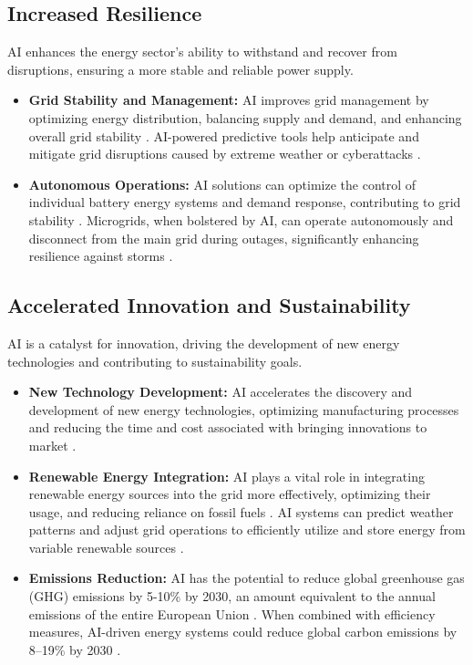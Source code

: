 \subsection{Increased Resilience}
AI enhances the energy sector's ability to withstand and recover from disruptions, ensuring a more stable and reliable power supply.
\begin{itemize}
    \item \textbf{Grid Stability and Management:} AI improves grid management by optimizing energy distribution, balancing supply and demand, and enhancing overall grid stability \cite{ATLTranslate_AI_Energy}. AI-powered predictive tools help anticipate and mitigate grid disruptions caused by extreme weather or cyberattacks \cite{EnergyGov_AI_Energy}.\cite{EnergyGov_AI_Energy_Initial}
    \item \textbf{Autonomous Operations:} AI solutions can optimize the control of individual battery energy systems and demand response, contributing to grid stability \cite{MicrogridKnowledge_AI}. Microgrids, when bolstered by AI, can operate autonomously and disconnect from the main grid during outages, significantly enhancing resilience against storms \cite{NACleanEnergy_AI}.
\end{itemize}

\subsection{Accelerated Innovation and Sustainability}
AI is a catalyst for innovation, driving the development of new energy technologies and contributing to sustainability goals.
\begin{itemize}
    \item \textbf{New Technology Development:} AI accelerates the discovery and development of new energy technologies, optimizing manufacturing processes and reducing the time and cost associated with bringing innovations to market \cite{EnergyGov_AI_Energy}.\cite{EnergyGov_AI_Energy_Initial}
    \item \textbf{Renewable Energy Integration:} AI plays a vital role in integrating renewable energy sources into the grid more effectively, optimizing their usage, and reducing reliance on fossil fuels \cite{ATLTranslate_AI_Energy}. AI systems can predict weather patterns and adjust grid operations to efficiently utilize and store energy from variable renewable sources \cite{InfinitiResearch_AI_Energy}.
    \item \textbf{Emissions Reduction:} AI has the potential to reduce global greenhouse gas (GHG) emissions by 5-10\% by 2030, an amount equivalent to the annual emissions of the entire European Union \cite{WEF_AI_Energy_2023}. When combined with efficiency measures, AI-driven energy systems could reduce global carbon emissions by 8--19\% by 2030 \cite{AInvest_Chevron}.
\end{itemize}

